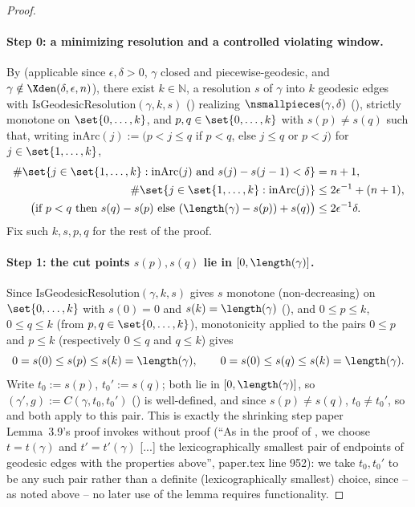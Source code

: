 \begin{proof}
  \paragraph{Step 0: a minimizing resolution and a controlled violating window.} By
   (applicable since $\epsilon,\delta>0$, $\gamma$ closed
  and piecewise-geodesic, and $\gamma \notin \Xden(\delta,\epsilon,n)$), there exist $k \in
  \mathbb{N}$, a resolution $s$ of $\gamma$ into $k$ geodesic edges with $\mathrm{IsGeodesicResolution}
  (\gamma,k,s)$ () realizing $\nsmallpieces(\gamma,\delta)$
  (), strictly monotone on $\set{0,\dots,k}$, and $p,q \in \set{0,\dots,k}$
  with $s(p) \ne s(q)$ such that, writing $\mathrm{inArc}(j) := (p<j\le q$ if $p<q$, else $j\le q$
  or $p<j)$ for $j\in\set{1,\dots,k}$,
  \begin{align}
    \label{eq:exact-n1}
    \#\set{j\in\set{1,\dots,k} : \mathrm{inArc}(j) \text{ and } s(j)-s(j-1)<\delta} &= n+1 ,\\
    \label{eq:total-bound}
    \#\set{j\in\set{1,\dots,k} : \mathrm{inArc}(j)} &\le 2\epsilon^{-1}+(n+1) ,\\
    \label{eq:arc-length}
    \bigl(\text{if } p<q \text{ then } s(q)-s(p) \text{ else } (\length(\gamma)-s(p))+s(q)\bigr)
      &\le 2\epsilon^{-1}\delta .
  \end{align}
  Fix such $k,s,p,q$ for the rest of the proof.

  \paragraph{Step 1: the cut points $s(p),s(q)$ lie in $[0,\length(\gamma)]$.} Since
  $\mathrm{IsGeodesicResolution}(\gamma,k,s)$ gives $s$ monotone (non-decreasing) on
  $\set{0,\dots,k}$ with $s(0)=0$ and $s(k)=\length(\gamma)$ (), and
  $0\le p\le k$, $0\le q\le k$ (from $p,q\in\set{0,\dots,k}$), monotonicity applied to the pairs
  $0\le p$ and $p\le k$ (respectively $0\le q$ and $q\le k$) gives
  \[
    0 = s(0) \le s(p) \le s(k) = \length(\gamma)
    , \qquad
    0 = s(0) \le s(q) \le s(k) = \length(\gamma)
    .
  \]
  Write $t_0 := s(p)$, $t_0' := s(q)$; both lie in $[0,\length(\gamma)]$, so
  $(\gamma',g) := C(\gamma,t_0,t_0')$ () is well-defined, and since $s(p)\ne s(q)$,
  $t_0 \ne t_0'$, so  and  both apply to this pair.
  This is exactly the shrinking step paper Lemma~3.9's proof invokes without proof (``As in the
  proof of , we choose $t=t(\gamma)$ and $t'=t'(\gamma)$ [...] the lexicographically
  smallest pair of endpoints of geodesic edges with the properties above'', paper.tex line 952):
  we take $t_0,t_0'$ to be any such pair rather than a definite (lexicographically smallest) choice,
  since -- as noted above -- no later use of the lemma requires functionality.


\end{proof}
